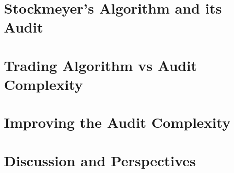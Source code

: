 \documentclass[letterpaper]{article}
\begin{document}

  
\section{Stockmeyer's Algorithm and its Audit}
\label{sec:stock}


\section{Trading Algorithm vs Audit Complexity}
\label{sec:bgp}



\section{Improving the Audit Complexity}
\label{sec:combined}




\section{Discussion and Perspectives}
\label{sec:conclusion}
















\end{document}
